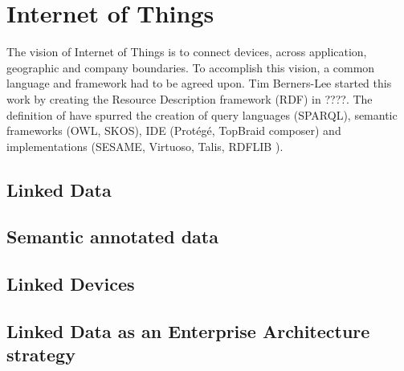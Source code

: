 \section{Internet of Things}
The vision of Internet of Things is to connect devices, across application, geographic and company boundaries. To accomplish this vision, a common language and framework had to be agreed upon. Tim Berners-Lee started this work by creating the Resource Description framework (RDF) in ????. The definition of have spurred the creation of query languages (SPARQL), semantic frameworks (OWL, SKOS), IDE (Prot\'eg\'e, TopBraid composer) and implementations (SESAME, Virtuoso, Talis, RDFLIB ).

\subsection{Linked Data}

\subsection{Semantic annotated data}
\subsection{Linked Devices}
\subsection{Linked Data as an Enterprise Architecture strategy}

